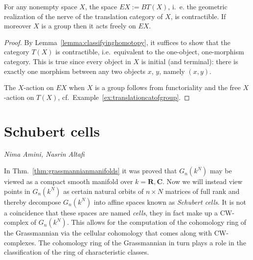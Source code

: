 \documentclass[a4paper,openany]{scrbook}
\newcommand{\chapterauthor}[1]{\hfill\emph{#1}\par\noindent}
\begin{document}
\begin{corollary}\label{cor:EG}
For any nonempty space $X$, the space $EX := BT(X)$, i.~e. the geometric realization of the nerve of the translation category of $X$, is contractible. If moreover $X$ is a group then it acts freely on $EX$.
\end{corollary}
\begin{proof}
By Lemma~\ref{lemma:classifyinghomotopy}, it suffices to show that the category $T(X)$ is contractible, i.e.\ equivalent to the one-object, one-morphism category. This is true since every object in $X$ is initial (and terminal): there is exactly one morphism between any two objects $x$, $y$, namely $(x,y)$.

The $X$-action on $EX$ when $X$ is a group follows from functoriality and the free $X$-action on $T(X)$, cf.~Example~\ref{ex:translationcatofgroup}.
\end{proof}

\section{Schubert cells}


\chapterauthor{Nima Amini, Nasrin Altafi}

In Thm.~\ref{thm:grassmannianmanifolds} it was proved that $G_n(k^N)$ may be viewed as a compact smooth manifold over $k = \mathbf{R}, \mathbf{C}$. 
Now we will instead view points in $G_n(k^N)$ as certain natural orbits of $n \times N$ matrices of full rank and thereby decompose $G_n(k^N)$ into affine spaces known as \textit{Schubert cells}. 
It is not a coincidence that these spaces are named \textit{cells}, they in fact make up a CW-complex of $G_n(k^N)$. 
This allows for the computation of the cohomology ring of the Grassmannian via the cellular cohomology that comes along with CW-complexes. 
The cohomology ring of the Grassmannian in turn plays a role in the classification of the ring of characteristic classes. 
\end{document}
